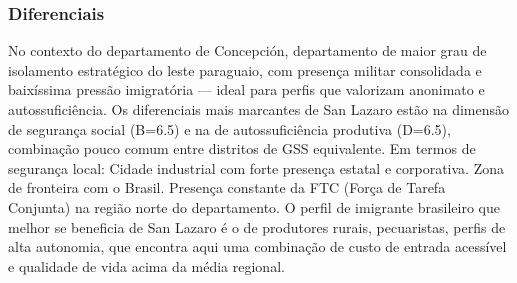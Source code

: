 \subsubsection*{Diferenciais}\label{dif-san-lazaro-0106}
No contexto do departamento de Concepción, departamento de maior grau de isolamento estratégico do leste paraguaio, com presença militar consolidada e baixíssima pressão imigratória — ideal para perfis que valorizam anonimato e autossuficiência. Os diferenciais mais marcantes de San Lazaro estão na dimensão de segurança social (B=6.5) e na de autossuficiência produtiva (D=6.5), combinação pouco comum entre distritos de GSS equivalente. Em termos de segurança local: Cidade industrial com forte presença estatal e corporativa. Zona de fronteira com o Brasil. Presença constante da FTC (Força de Tarefa Conjunta) na região norte do departamento. O perfil de imigrante brasileiro que melhor se beneficia de San Lazaro é o de produtores rurais, pecuaristas, perfis de alta autonomia, que encontra aqui uma combinação de custo de entrada acessível e qualidade de vida acima da média regional.
